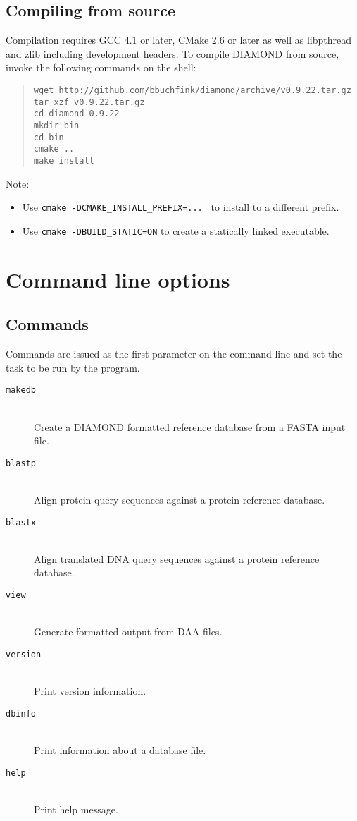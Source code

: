 \documentclass[11pt]{article}
\newcommand{\CURRENT}{0.9.22}
\begin{document}
\subsection{Compiling from source}
Compilation requires GCC 4.1 or later, CMake 2.6 or later as well as libpthread and zlib including development headers. To compile DIAMOND from source, invoke the following commands on the shell:
\begin{quote}
\texttt{wget http://github.com/bbuchfink/diamond/archive/v\CURRENT.tar.gz\\
tar xzf v\CURRENT.tar.gz\\
cd diamond-\CURRENT\\
mkdir bin\\
cd bin\\
cmake ..\\
make install}
\end{quote}
Note:
\begin{itemize}
\item
Use \texttt{cmake -DCMAKE\_INSTALL\_PREFIX=... } to install to a different prefix.
\item
Use \texttt{cmake -DBUILD\_STATIC=ON} to create a statically linked executable.
\end{itemize}

\section{Command line options}
\subsection{Commands}
Commands are issued as the first parameter on the command line and set the task to be run by the program.
\begin{description}
\item[\texttt{makedb}]\hfill\\
Create a DIAMOND formatted reference database from a FASTA input file.
\item[\texttt{blastp}]\hfill\\
Align protein query sequences against a protein reference database.
\item[\texttt{blastx}]\hfill\\
Align translated DNA query sequences against a protein reference database.
\item[\texttt{view}]\hfill\\
Generate formatted output from DAA files.
\item[\texttt{version}]\hfill\\
Print version information.
\item[\texttt{dbinfo}]\hfill\\
Print information about a database file.
\item[\texttt{help}]\hfill\\
Print help message.
\end{description}
\end{document}

